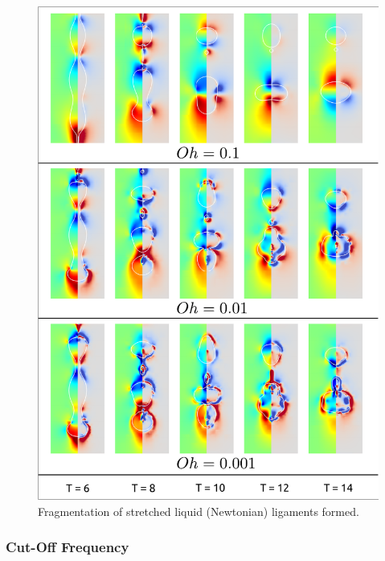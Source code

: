 \begin{figure}
\centering
\includegraphics{plots/ligament_breakup/ohnesorge_compare.pdf}
\caption{Fragmentation of stretched liquid (Newtonian) ligaments formed. 
	}
\label{amp_comp}
\end{figure}

\subsubsection*{Cut-Off Frequency}

